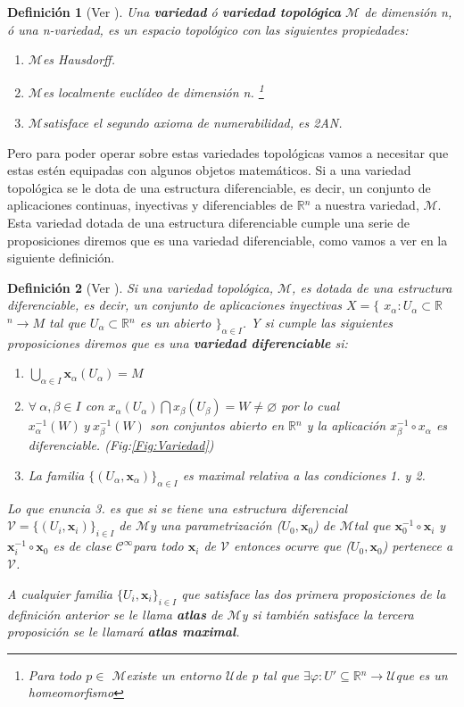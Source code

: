 \documentclass[pdftex,11pt,a4paper]{book}
\newtheorem{defi}{Definici\'on}
\newcommand{\M}{$\mathscr{M}$}
\newcommand{\U}{$\mathscr{U}$}
\newcommand{\Cinf}{ $\mathscr{C}^\infty$}
\newcommand{\R}{$\mathbb{R}$}
\renewcommand{\emptyset}{\varnothing}
\begin{document}
\begin{defi}[Ver \cite{boothby}]
Una \textbf{variedad} ó \textbf{variedad topológica} $\mathcal{M}$ de dimensión n, ó una n-variedad, es un espacio topológico con las siguientes propiedades:
\begin{enumerate}
\item \M es Hausdorff.
\item \M es localmente euclídeo de dimensión n. \footnote{Para todo $p \in$  \M existe un entorno \U de p tal que $\exists \varphi: U' \subseteq $\R$^n \to $\U  que es un homeomorfismo}
\item \M satisface el segundo axioma de numerabilidad, es 2AN.
\end{enumerate}
\label{def:variedad_topo}

\end{defi}

Pero para poder operar sobre estas variedades topológicas vamos a necesitar que estas estén equipadas con algunos objetos matemáticos. Si a una variedad topológica se le dota de una estructura diferenciable, es decir, un conjunto de aplicaciones continuas, inyectivas y diferenciables de \R$^n$ a nuestra variedad, \M. Esta variedad dotada de una estructura diferenciable cumple una serie de proposiciones diremos que es una variedad diferenciable, como vamos a ver en la siguiente definición.


\begin{defi}[Ver \cite{DoCarmoRiemann}]
Si una variedad topológica, \M, es dotada de una estructura diferenciable, es decir, un conjunto de aplicaciones inyectivas $X = \lbrace$ $ x_\alpha : U_\alpha \subset $\R$^n \rightarrow M $ tal que $U_\alpha \subset $\R$^n$ es un abierto  $\rbrace_{\alpha \in I}$. Y si cumple las siguientes proposiciones diremos que es una \textbf{variedad diferenciable} si:
 \begin{enumerate}
 \item $\bigcup_{\alpha\in I} \textbf{x}_\alpha(U_\alpha) = M $
 \item $\forall \ \alpha , \beta \in I $ con $x_\alpha(U_\alpha) \bigcap x_\beta(U_\beta) = W \neq \emptyset $ por lo cual
 $ x_\alpha^{-1}(W) \ y \  x_\beta^{-1}(W) $ son conjuntos abierto en \R$^n$ y la aplicación $x_\beta^{-1}\circ x_\alpha $ es diferenciable. (Fig:\ref{Fig:Variedad})
 \item La familia $\lbrace(U_\alpha, \textbf{x}_\alpha)\rbrace_{\alpha \in I}$ es maximal relativa a las condiciones 1. y 2.
\end{enumerate} 
 Lo que enuncia 3. es que si se tiene una estructura diferencial $\mathscr{V} =\{ (U_i, \textbf{x}_i) \}_{i \in I}$ de \M y una parametrización ($U_0, \textbf{x}_0$) de \M tal que $\textbf{x}_0^{-1} \circ \textbf{x}_i $ y $\textbf{x}^{-1}_i \circ \textbf{x}_0$ es de clase \Cinf para todo  $\textbf{x}_i$ de  $\mathscr{V}$ entonces ocurre que  ($U_0, \textbf{x}_0$) pertenece a  $\mathscr{V}$.
 
A cualquier familia $\lbrace U_i, \textbf{x}_i \rbrace_{i \in I} $ que satisface las dos primera proposiciones de la definición anterior se le llama \textbf{atlas} de \M y si también satisface la tercera proposición  se le llamará \textbf{atlas maximal}.
\label{def:variedad_dif}
\end{defi}
\end{document}
